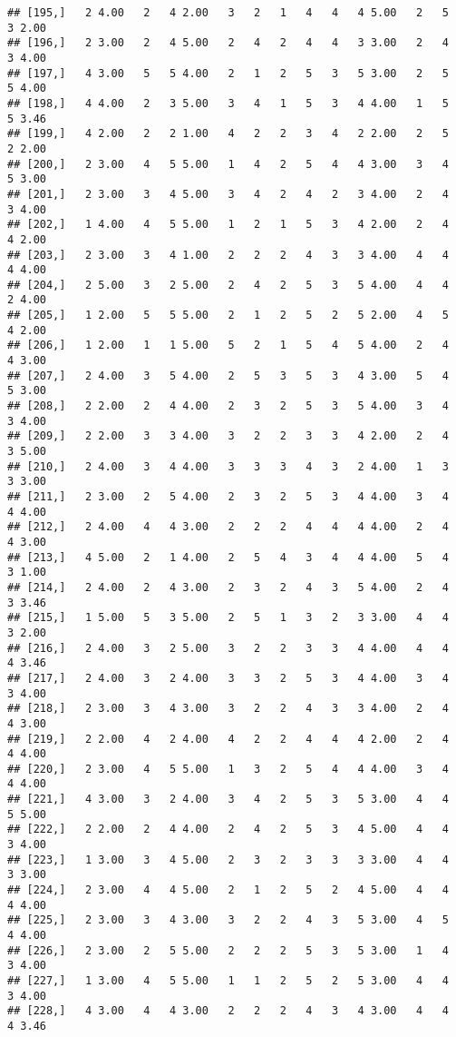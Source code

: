 \documentclass[]{article}
\begin{document}
\begin{verbatim}
## [195,]   2 4.00   2   4 2.00   3   2   1   4   4   4 5.00   2   5   3 2.00
## [196,]   2 3.00   2   4 5.00   2   4   2   4   4   3 3.00   2   4   3 4.00
## [197,]   4 3.00   5   5 4.00   2   1   2   5   3   5 3.00   2   5   5 4.00
## [198,]   4 4.00   2   3 5.00   3   4   1   5   3   4 4.00   1   5   5 3.46
## [199,]   4 2.00   2   2 1.00   4   2   2   3   4   2 2.00   2   5   2 2.00
## [200,]   2 3.00   4   5 5.00   1   4   2   5   4   4 3.00   3   4   5 3.00
## [201,]   2 3.00   3   4 5.00   3   4   2   4   2   3 4.00   2   4   3 4.00
## [202,]   1 4.00   4   5 5.00   1   2   1   5   3   4 2.00   2   4   4 2.00
## [203,]   2 3.00   3   4 1.00   2   2   2   4   3   3 4.00   4   4   4 4.00
## [204,]   2 5.00   3   2 5.00   2   4   2   5   3   5 4.00   4   4   2 4.00
## [205,]   1 2.00   5   5 5.00   2   1   2   5   2   5 2.00   4   5   4 2.00
## [206,]   1 2.00   1   1 5.00   5   2   1   5   4   5 4.00   2   4   4 3.00
## [207,]   2 4.00   3   5 4.00   2   5   3   5   3   4 3.00   5   4   5 3.00
## [208,]   2 2.00   2   4 4.00   2   3   2   5   3   5 4.00   3   4   3 4.00
## [209,]   2 2.00   3   3 4.00   3   2   2   3   3   4 2.00   2   4   3 5.00
## [210,]   2 4.00   3   4 4.00   3   3   3   4   3   2 4.00   1   3   3 3.00
## [211,]   2 3.00   2   5 4.00   2   3   2   5   3   4 4.00   3   4   4 4.00
## [212,]   2 4.00   4   4 3.00   2   2   2   4   4   4 4.00   2   4   4 3.00
## [213,]   4 5.00   2   1 4.00   2   5   4   3   4   4 4.00   5   4   3 1.00
## [214,]   2 4.00   2   4 3.00   2   3   2   4   3   5 4.00   2   4   3 3.46
## [215,]   1 5.00   5   3 5.00   2   5   1   3   2   3 3.00   4   4   3 2.00
## [216,]   2 4.00   3   2 5.00   3   2   2   3   3   4 4.00   4   4   4 3.46
## [217,]   2 4.00   3   2 4.00   3   3   2   5   3   4 4.00   3   4   3 4.00
## [218,]   2 3.00   3   4 3.00   3   2   2   4   3   3 4.00   2   4   4 3.00
## [219,]   2 2.00   4   2 4.00   4   2   2   4   4   4 2.00   2   4   4 4.00
## [220,]   2 3.00   4   5 5.00   1   3   2   5   4   4 4.00   3   4   4 4.00
## [221,]   4 3.00   3   2 4.00   3   4   2   5   3   5 3.00   4   4   5 5.00
## [222,]   2 2.00   2   4 4.00   2   4   2   5   3   4 5.00   4   4   3 4.00
## [223,]   1 3.00   3   4 5.00   2   3   2   3   3   3 3.00   4   4   3 3.00
## [224,]   2 3.00   4   4 5.00   2   1   2   5   2   4 5.00   4   4   4 4.00
## [225,]   2 3.00   3   4 3.00   3   2   2   4   3   5 3.00   4   5   4 4.00
## [226,]   2 3.00   2   5 5.00   2   2   2   5   3   5 3.00   1   4   3 4.00
## [227,]   1 3.00   4   5 5.00   1   1   2   5   2   5 3.00   4   4   3 4.00
## [228,]   4 3.00   4   4 3.00   2   2   2   4   3   4 3.00   4   4   4 3.46

\end{verbatim}
\end{document}
